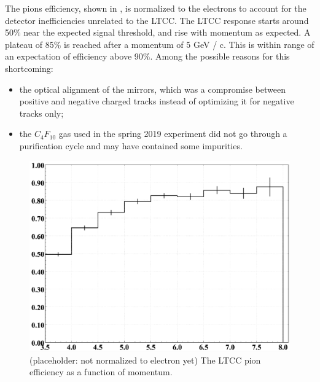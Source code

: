 The pions efficiency, shown in , is normalized to the electrons to account for the detector
inefficiencies unrelated to the LTCC. The LTCC response starts around 50$\%$ near the expected signal threshold,
and rise with momentum as expected. A plateau of 85$\%$ is reached after a momentum of 5 GeV / c.
This is within range of an expectation of efficiency above 90$\%$. Among the possible reasons for this shortcoming:

\begin{itemize}
	\item   the optical alignment of the mirrors, which was a compromise between
	        positive and negative charged tracks instead of optimizing it for negative tracks only;
    \item  the  $C_4F_{10}$ gas used in the spring 2019 experiment did not go through a purification cycle and
			  may have contained some impurities.
\end{itemize}


\begin{figure}
	\centering
	\includegraphics[width=0.98\columnwidth,keepaspectratio]{img/pionEfficiency.png}
	\caption{(placeholder: not normalized to electron yet) The LTCC pion efficiency as a function of momentum.  }
	\label{fig:pionEfficiency}
\end{figure}






